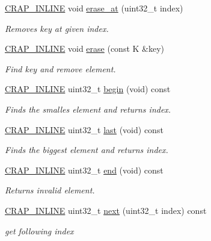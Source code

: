 \begin{DoxyCompactItemize}
\hyperlink{config__x86_8h_a5a40526b8d842e7ff731509998bb0f1c}{C\+R\+A\+P\+\_\+\+I\+N\+L\+I\+N\+E} void \hyperlink{classcrap_1_1tree__map_add39f3a7ad51cc8bdf41b89dbd93e7e9}{erase\+\_\+at} (uint32\+\_\+t index)
\begin{DoxyCompactList}\small\item\em Removes key at given index. \end{DoxyCompactList}\item 
\hyperlink{config__x86_8h_a5a40526b8d842e7ff731509998bb0f1c}{C\+R\+A\+P\+\_\+\+I\+N\+L\+I\+N\+E} void \hyperlink{classcrap_1_1tree__map_a4e7f6c5e909954c0ce8fb747eb67e560}{erase} (const K \&key)
\begin{DoxyCompactList}\small\item\em Find key and remove element. \end{DoxyCompactList}\item 
\hyperlink{config__x86_8h_a5a40526b8d842e7ff731509998bb0f1c}{C\+R\+A\+P\+\_\+\+I\+N\+L\+I\+N\+E} uint32\+\_\+t \hyperlink{classcrap_1_1tree__map_a9c58b3571994b80be731851994a76efe}{begin} (void) const 
\begin{DoxyCompactList}\small\item\em Finds the smalles element and returns index. \end{DoxyCompactList}\item 
\hyperlink{config__x86_8h_a5a40526b8d842e7ff731509998bb0f1c}{C\+R\+A\+P\+\_\+\+I\+N\+L\+I\+N\+E} uint32\+\_\+t \hyperlink{classcrap_1_1tree__map_a85216dea6bbcc284a0c32dc4dafbceba}{last} (void) const 
\begin{DoxyCompactList}\small\item\em Finds the biggest element and returns index. \end{DoxyCompactList}\item 
\hyperlink{config__x86_8h_a5a40526b8d842e7ff731509998bb0f1c}{C\+R\+A\+P\+\_\+\+I\+N\+L\+I\+N\+E} uint32\+\_\+t \hyperlink{classcrap_1_1tree__map_a833fd2d7bf97560a8c1caa956eed8cdf}{end} (void) const 
\begin{DoxyCompactList}\small\item\em Returns invalid element. \end{DoxyCompactList}\item 
\hyperlink{config__x86_8h_a5a40526b8d842e7ff731509998bb0f1c}{C\+R\+A\+P\+\_\+\+I\+N\+L\+I\+N\+E} uint32\+\_\+t \hyperlink{classcrap_1_1tree__map_a051007118a7093cae6c8f01e454fbe85}{next} (uint32\+\_\+t index) const 
\begin{DoxyCompactList}\small\item\em get following index \end{DoxyCompactList}\item 

\end{DoxyCompactItemize}
